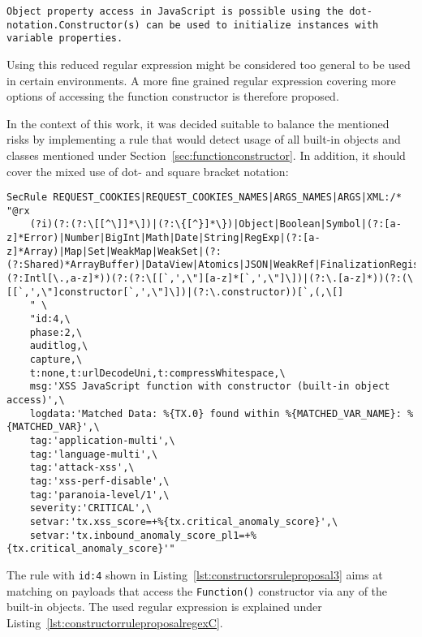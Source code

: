 \begin{lstlisting}[style=basicStyle]
Object property access in JavaScript is possible using the dot-notation.Constructor(s) can be used to initialize instances with variable properties.
\end{lstlisting}

Using this reduced regular expression might be considered too general to be used in certain environments. A more fine grained regular expression covering more options of accessing the function constructor is therefore proposed. 

In the context of this work, it was decided suitable to balance the mentioned risks by implementing a rule that would detect usage of all built-in objects and classes mentioned under Section~\ref{sec:functionconstructor}. In addition, it should cover the mixed use of dot- and square bracket notation: 

\begin{lstlisting}[style=basicStyle, caption=Rule proposal to block usage of Function() constructor via built-in objects, label={lst:constructorsruleproposal3}]
SecRule REQUEST_COOKIES|REQUEST_COOKIES_NAMES|ARGS_NAMES|ARGS|XML:/* "@rx 
    (?i)(?:(?:\[[^\]]*\])|(?:\{[^}]*\})|Object|Boolean|Symbol|(?:[a-z]*Error)|Number|BigInt|Math|Date|String|RegExp|(?:[a-z]*Array)|Map|Set|WeakMap|WeakSet|(?:(?:Shared)*ArrayBuffer)|DataView|Atomics|JSON|WeakRef|FinalizationRegistry|Iterator|AsyncIterator|Promise|GeneratorFunction|AsyncGeneratorFunction|Generator|AsyncGenerator|AsyncFunction|Reflect|Proxy|(?:Intl[\.,a-z]*))(?:(?:\[[`,',\"][a-z]*[`,',\"]\])|(?:\.[a-z]*))(?:(\[[`,',\"]constructor[`,',\"]\])|(?:\.constructor))[`,(,\[] 
    " \
    "id:4,\
    phase:2,\
    auditlog,\
    capture,\
    t:none,t:urlDecodeUni,t:compressWhitespace,\
    msg:'XSS JavaScript function with constructor (built-in object access)',\
    logdata:'Matched Data: %{TX.0} found within %{MATCHED_VAR_NAME}: %{MATCHED_VAR}',\
    tag:'application-multi',\
    tag:'language-multi',\
    tag:'attack-xss',\
    tag:'xss-perf-disable',\
    tag:'paranoia-level/1',\
    severity:'CRITICAL',\
    setvar:'tx.xss_score=+%{tx.critical_anomaly_score}',\
    setvar:'tx.inbound_anomaly_score_pl1=+%{tx.critical_anomaly_score}'"
\end{lstlisting}

The rule with \verb|id:4| shown in Listing~\ref{lst:constructorsruleproposal3} aims at matching on payloads that access the \verb|Function()| constructor via any of the built-in objects. The used regular expression is explained under Listing~\ref{lst:constructorruleproposalregexC}.


